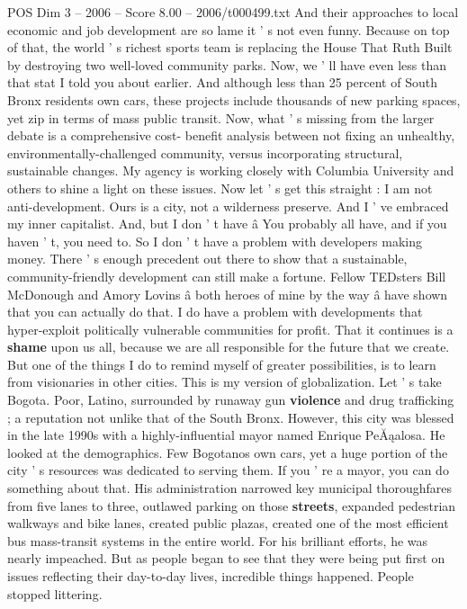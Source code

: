 \begin{textsample}{POS Dim 3 – 2006 – Score 8.00 – 2006/t000499.txt}
And their approaches to local economic and job development are so lame it ' s not even funny.
Because on top of that, the world ' s richest sports team is replacing the House That Ruth Built by destroying two well-loved community parks.
Now, we ' ll have even less than that stat I told you about earlier.
And although less than 25 percent of South Bronx residents own cars, these projects include thousands of new parking spaces, yet zip in terms of mass public transit.
Now, what ' s missing from the larger debate is a comprehensive cost- benefit analysis between not fixing an unhealthy, environmentally-challenged community, versus incorporating structural, sustainable changes.
My agency is working closely with Columbia University and others to shine a light on these issues.
Now let ' s get this straight : I am not anti-development.
Ours is a city, not a wilderness preserve.
And I ' ve embraced my inner capitalist.
And, but I don ' t have â You probably all have, and if you haven ' t, you need to.
So I don ' t have a problem with developers making money.
There ' s enough precedent out there to show that a sustainable, community-friendly development can still make a fortune.
Fellow TEDsters Bill McDonough and Amory Lovins â both heroes of mine by the way â have shown that you can actually do that.
I do have a problem with developments that hyper-exploit politically vulnerable communities for profit.
That it continues is a \textbf{shame} upon us all, because we are all responsible for the future that we create.
But one of the things I do to remind myself of greater possibilities, is to learn from visionaries in other cities.
This is my version of globalization.
Let ' s take Bogota.
Poor, Latino, surrounded by runaway gun \textbf{violence} and drug trafficking ; a reputation not unlike that of the South Bronx.
However, this city was blessed in the late 1990s with a highly-influential mayor named Enrique PeĂąalosa.
He looked at the demographics.
Few Bogotanos own cars, yet a huge portion of the city ' s resources was dedicated to serving them.
If you ' re a mayor, you can do something about that.
His administration narrowed key municipal thoroughfares from five lanes to three, outlawed parking on those \textbf{streets}, expanded pedestrian walkways and bike lanes, created public plazas, created one of the most efficient bus mass-transit systems in the entire world.
For his brilliant efforts, he was nearly impeached.
But as people began to see that they were being put first on issues reflecting their day-to-day lives, incredible things happened.
People stopped littering.

\end{textsample}
